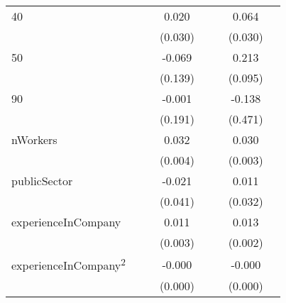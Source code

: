 {\begin{longtable}{l*{3}{c}|l*{3}{c}}
		40                  &                     &                     &       0.020         &                     &                     &       0.064\sym{*}  \\
		&                     &                     &     (0.030)         &                     &                     &     (0.030)         \\
		50                  &                     &                     &      -0.069         &                     &                     &       0.213\sym{*}  \\
		&                     &                     &     (0.139)         &                     &                     &     (0.095)         \\
		90                  &                     &                     &      -0.001         &                     &                     &      -0.138         \\
		&                     &                     &     (0.191)         &                     &                     &     (0.471)         \\
		nWorkers            &                     &                     &       0.032\sym{***}&                     &                     &       0.030\sym{***}\\
		&                     &                     &     (0.004)         &                     &                     &     (0.003)         \\
		publicSector      &                     &                     &      -0.021         &                     &                     &       0.011         \\
		&                     &                     &     (0.041)         &                     &                     &     (0.032)         \\
		experienceInCompany &                     &                     &       0.011\sym{***}&                     &                     &       0.013\sym{***}\\
		&                     &                     &     (0.003)         &                     &                     &     (0.002)         \\
		experienceInCompany\textsuperscript{2}&                     &                     &      -0.000\sym{*}  &                     &                     &      -0.000\sym{***}\\
		&                     &                     &     (0.000)         &                     &                     &     (0.000)         \\

\end{longtable}}
